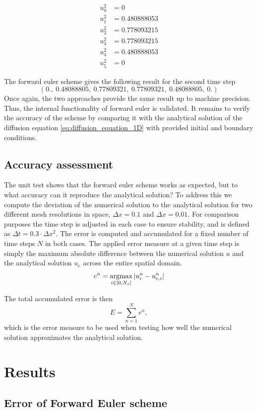 \documentclass[12pt]{extarticle}
\begin{document}
\begin{align*}
	u_0^2 &= 0 \\
	u_1^2 &= 0.480888053 \\
	u_2^2 &= 0.778093215 \\
	u_3^2 &= 0.778093215 \\
	u_4^2 &= 0.480888053 \\
	u_5^2 &= 0
\end{align*}

The forward euler scheme gives the following result for the second time step
\[ (0.,\:         0.48088805,\: 0.77809321,\: 0.77809321,\: 0.48088805,\: 0.        ) \]
Once again, the two approaches provide the same result up to machine precision. Thus, the internal functionality of forward euler is validated. It remains to verify the accuracy of the scheme by comparing it with the analytical solution of the diffusion equation \ref{eq:diffusion_equation_1D} with provided initial and boundary conditions.

\subsection*{Accuracy assessment}
The unit test shows that the forward euler scheme works as expected, but to what accuracy can it reproduce the analytical solution? To address this we compute the deviation of the numerical solution to the analytical solution for two different mesh resolutions in space, $\Delta x=0.1$ and $\Delta x = 0.01$. For comparison purposes the time step is adjusted in each case to ensure stability, and is defined as $\Delta t = 0.3\cdot \Delta x^2$. The error is computed and accumulated for a fixed number of time steps $N$ in both cases. The applied error measure at a given time step is simply the maximum absolute difference between the numerical solution $u$ and the analytical solution $u_e$ across the entire spatial domain.
\[ e^n = \operatorname*{argmax}_{i \in [0,N_x]} |u_i^n - u_{e,i}^n| \]

The total accumulated error is then
\[ E = \sum_{n=1}^N e^n, \]
which is the error measure to be used when testing how well the numerical solution approximates the analytical solution.



\section{Results}

\subsection*{Error of Forward Euler scheme}
\end{document}
